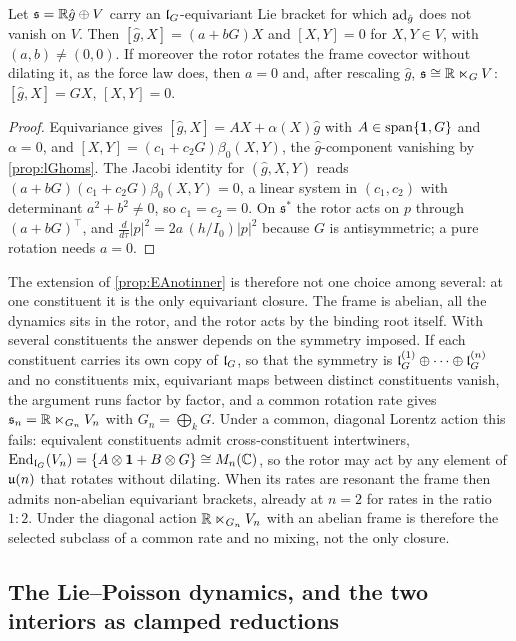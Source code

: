 \begin{theorem}
\label{thm:closureunique}
Let $\mathfrak s=\mathbb{R}\hat g\oplus V$ carry an $\mathfrak l_G$-equivariant Lie bracket for which $\operatorname{ad}_{\hat g}$ does not vanish on $V$. Then
$[\hat g,X]=(a+bG)X$ and $[X,Y]=0$ for $X,Y\in V$, with $(a,b)\neq(0,0)$. If moreover the rotor rotates the frame covector without dilating it,
as the force law does, then $a=0$ and, after rescaling $\hat g$, $\mathfrak s\cong\mathbb{R}\ltimes_GV$: $[\hat g,X]=GX$, $[X,Y]=0$.
\end{theorem}

\begin{proof}
Equivariance gives $[\hat g,X]=AX+\alpha(X)\hat g$ with $A\in\operatorname{span}\{\mathbf 1,G\}$ and $\alpha=0$, and $[X,Y]=(c_1+c_2G)\beta_0(X,Y)$, the
$\hat g$-component vanishing by \cref{prop:lGhoms}. The Jacobi identity for $(\hat g,X,Y)$ reads $(a+bG)(c_1+c_2G)\beta_0(X,Y)=0$, a linear system in
$(c_1,c_2)$ with determinant $a^2+b^2\neq0$, so $c_1=c_2=0$. On $\mathfrak s^*$ the rotor acts on $p$ through $(a+bG)^{\!\top}$, and
$\tfrac{d}{d\tau}|p|^2=2a\,(h/I_0)|p|^2$ because $G$ is antisymmetric; a pure rotation needs $a=0$.
\end{proof}

The extension of \cref{prop:EAnotinner} is therefore not one choice among several: at one constituent it is the only equivariant closure. The
frame is abelian, all the dynamics sits in the rotor, and the rotor acts by the binding root itself. With several constituents the answer depends on
the symmetry imposed. If each constituent carries its own copy of $\mathfrak l_G$, so that the symmetry is $\mathfrak l_G^{(1)}\oplus\cdots\oplus\mathfrak l_G^{(n)}$ and no
constituents mix, equivariant maps between distinct constituents vanish, the argument runs factor by factor, and a common rotation rate gives
$\mathfrak s_n=\mathbb{R}\ltimes_{G_n}V_n$ with $G_n=\bigoplus_kG$. Under a common, diagonal Lorentz action this fails: equivalent constituents admit
cross-constituent intertwiners, $\operatorname{End}_{\mathfrak l_G}(V_n)=\{A\otimes\mathbf 1+B\otimes G\}\cong M_n(\mathbb{C})$, so the rotor may act by any element of $\mathfrak{u}(n)$ that
rotates without dilating. When its rates are resonant the frame then admits non-abelian equivariant brackets, already at $n=2$ for rates in the
ratio $1:2$. Under the diagonal action $\mathbb{R}\ltimes_{G_n}V_n$ with an abelian frame is therefore the selected subclass of a common rate and no
mixing, not the only closure.

\subsection{The Lie--Poisson dynamics, and the two interiors as clamped reductions}
\label{sec:closureLP}

